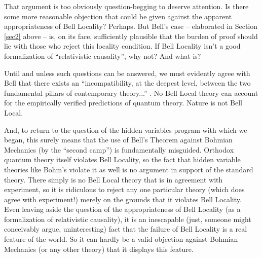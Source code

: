 \documentclass[aps,prc,onecolumn,12pt,nofootinbib]{revtex4-2}
\begin{document}
That argument is too obviously question-begging
to deserve attention.
Is there some more reasonable objection that could be given against
the apparent appropriateness of Bell Locality?  Perhaps.  But
Bell's case -- elaborated in Section \ref{sec2} above -- is, on its face,
sufficiently plausible that the burden of proof should lie with those
who reject this locality condition.  If Bell Locality isn't a good
formalization of ``relativistic causality'', why not?  And what is?

Until and unless such questions can be answered, we must evidently
agree with Bell that there exists an ``incompatibility, at the deepest
level, between the two fundamental pillars of contemporary theory...''
\cite[pg 172]{bell}.  No Bell Local theory can account for the
empirically verified predictions of quantum theory.  Nature
is not Bell Local.

And, to return to the question of the hidden
variables program with which we began, this surely means that the
use of Bell's Theorem against Bohmian Mechanics (by the ``second
camp'') is fundamentally misguided.  Orthodox quantum theory
itself violates Bell Locality, so the fact that hidden variable
theories like Bohm's violate it as well is no argument in support
of the standard theory.  There simply is no Bell Local theory that is
in agreement with experiment, so it is ridiculous to reject any one
particular theory (which does agree with experiment!) merely on the
grounds that it violates Bell Locality.
Even leaving aside
the question of the appropriateness of Bell Locality (as a
formalization of relativistic causality), it is an inescapable (just,
someone might conceivably argue, uninteresting) fact that the
failure of Bell Locality is a
real feature of the world.  So it can hardly be a valid objection
against Bohmian Mechanics (or any other theory)
that it displays this feature.
\end{document}
